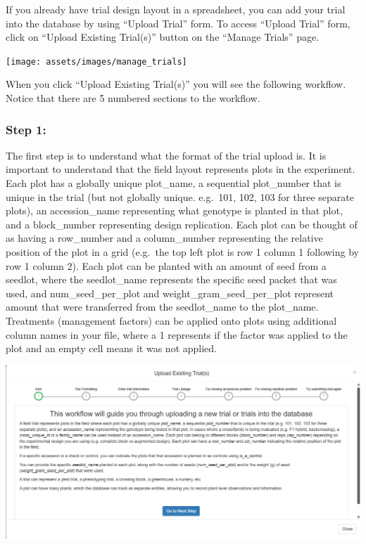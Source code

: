 \documentclass[
  12pt,
]{book}
\begin{document}
If you already have trial design layout in a spreadsheet, you can add your trial into the database by using ``Upload Trial'' form. To access ``Upload Trial'' form, click on ``Upload Existing Trial(s)'' button on the ``Manage Trials'' page.

\begin{center}\texttt{[image: assets/images/manage\_trials]} \end{center}

When you click ``Upload Existing Trial(s)'' you will see the following workflow. Notice that there are 5 numbered sections to the workflow.

\hypertarget{step-1}{%
\subsubsection*{Step 1:}\label{step-1}}


The first step is to understand what the format of the trial upload is. It is important to understand that the field layout represents plots in the experiment. Each plot has a globally unique plot\_name, a sequential plot\_number that is unique in the trial (but not globally unique. e.g.~101, 102, 103 for three separate plots), an accession\_name representing what genotype is planted in that plot, and a block\_number representing design replication. Each plot can be thought of as having a row\_number and a column\_number representing the relative position of the plot in a grid (e.g.~the top left plot is row 1 column 1 following by row 1 column 2). Each plot can be planted with an amount of seed from a seedlot, where the seedlot\_name represents the specific seed packet that was used, and num\_seed\_per\_plot and weight\_gram\_seed\_per\_plot represent amount that were transferred from the seedlot\_name to the plot\_name. Treatments (management factors) can be applied onto plots using additional column names in your file, where a 1 represents if the factor was applied to the plot and an empty cell means it was not applied.

\begin{center}\includegraphics[width=0.95\linewidth]{assets/images/manage_trials_upload_trial_1} \end{center}
\end{document}
